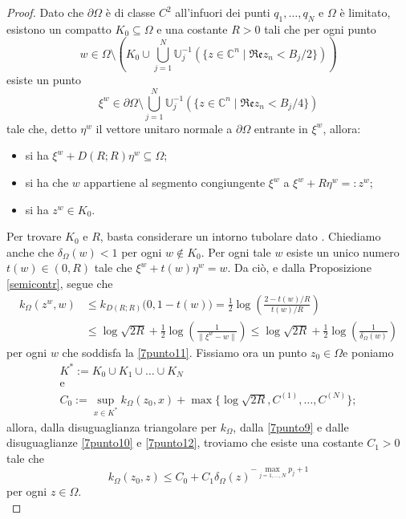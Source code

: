 \begin{proof}
    Dato che $\partial\Omega$ è di classe $C^2$ all'infuori dei punti $q_1,\dots,q_N$ e $\Omega$ è limitato, esistono un compatto $K_0\subseteq\Omega$ e una costante $R>0$ tali che per ogni punto
    \begin{equation}\label{7punto11}
        w\in\Omega\setminus\left(K_0\cup\bigcup_{j=1}^N\mathbb{U}_j^{-1}(\{z\in\mathbb{C}^n\mid\mathfrak{Re}z_n<B_j/2\})\right)
    \end{equation}
    esiste un punto
    $$\xi^w\in\partial\Omega\setminus\bigcup_{j=1}^N\mathbb{U}_j^{-1}(\{z\in\mathbb{C}^n\mid\mathfrak{Re}z_n<B_j/4\})$$
    tale che, detto $\eta^w$ il vettore unitaro normale a $\partial\Omega$ entrante in $\xi^w$, allora:
    \begin{itemize}
        \item si ha $\xi^w+D(R;R)\eta^w\subseteq \Omega$;
        \item si ha che $w$ appartiene al segmento congiungente $\xi^w$ a $\xi^w+R\eta^w=:z^w$;
        \item si ha $z^w\in K_0$.
    \end{itemize}
    Per trovare $K_0$ e $R$, basta considerare un intorno tubolare dato \cite[Chapter 9, Theorem 20]{S}. Chiediamo anche che $\delta_\Omega(w)<1$ per ogni $w\not\in K_0$. Per ogni tale $w$ esiste un unico numero $t(w)\in(0,R)$ tale che $\xi^w+t(w)\eta^w=w$. Da ciò, e dalla Proposizione \ref{semicontr}, segue che
    \begin{equation}\label{7punto12}
        \begin{aligned}
            k_\Omega(z^w,w)&\le k_{D(R;R)}\big(0,1-t(w)\big)=\frac{1}{2}\log\left(\frac{2-t(w)/R}{t(w)/R}\right)\\
            &\le\log{\sqrt{2R}}+\frac{1}{2}\log\left(\frac{1}{\|\xi^w-w\|}\right)\le\log{\sqrt{2R}}+\frac{1}{2}\log\left(\frac{1}{\delta_\Omega(w)}\right)
        \end{aligned}
    \end{equation}
    per ogni $w$ che soddisfa la \eqref{7punto11}. Fissiamo ora un punto $z_0\in\Omega$e  poniamo
    \begin{gather*}
        K^*:=K_0\cup K_1\cup\dots\cup K_N\\
        \text{e}\\
        C_0:=\displaystyle\sup_{x\in K^*}k_\Omega(z_0,x)+\max\{\log{\sqrt{2R}},C^{(1)},\dots,C^{(N)}\};
    \end{gather*}
    allora, dalla disuguaglianza triangolare per $k_\Omega$, dalla \eqref{7punto9} e dalle disuguaglianze \eqref{7punto10} e \eqref{7punto12}, troviamo che esiste una costante $C_1>0$ tale che
    $$k_\Omega(z_0,z)\le C_0+C_1\delta_\Omega(z)^{-\max_{j=1,\dots,N}p_j+1}$$
    per ogni $z\in\Omega$.\\


\end{proof}
